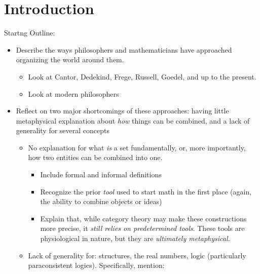 

\chapter{Introduction}
\label{ch:intro}


Startng Outline:
\begin{itemize}
  \item Describe the ways philosophers and mathematicians have approached organizing the world around them.
        \begin{itemize}
          \item Look at Cantor, Dedekind, Frege, Russell, Goedel, and up to the present.
          \item Look at modern philosophers
        \end{itemize}
  \item Reflect on two major shortcomings of these approaches: having little metaphysical explanation about \textit{how} things can be combined, and a lack of generality for several concepts
        \begin{itemize}
          \item No explanation for what \textit{is} a set fundamentally, or, more importantly, how two entities can be combined into one.
                \begin{itemize}
                  \item Include formal and informal definitions
                  \item Recognize the prior \textit{tool} used to start math in the first place (again, the ability to combine objects or ideas)
                  \item Explain that, while category theory may make these constructions more precise, it \textit{still relies on predetermined tools}.
                        These tools are physiological in nature, but they are \textit{ultimately metaphysical.}
                \end{itemize}
          \item Lack of generality for: structures, the real numbers, logic (particularly paraconsistent logics). Specifically, mention:

\end{itemize}
\end{itemize}
